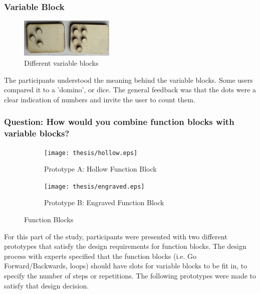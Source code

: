 \documentclass[oneside,%
                    author={Malak Hajji},
                    degree={BSc},
                    title={Designing An Accessible Computational Toolkit For Students},
                  subtitle={With Mixed Visual Abilities}]{dissertation}
\begin{document}
\subsubsection{Variable Block}

\FloatBarrier
\begin{figure}[h]
    \centering
    \includegraphics[width=0.4\textwidth]{thesis/variables.eps}
    \caption{Different variable blocks}
    \label{fig-variable}
\end{figure}
\FloatBarrier

The participants understood the meaning behind the variable blocks. Some users compared it to a 'domino', or dice. The general feedback was that the dots were a clear indication of numbers and invite the user to count them.

\subsubsection{Question: How would you combine function blocks with variable blocks?}

\FloatBarrier

\begin{figure}[h]
\centering
\begin{subfigure}{.5\textwidth}
  \centering
  \texttt{[image: thesis/hollow.eps]}
  \caption{Prototype A: Hollow Function Block}
  \label{fig-hollow}
\end{subfigure}%
\begin{subfigure}{.5\textwidth}
  \centering
  \texttt{[image: thesis/engraved.eps]}
  \caption{Prototype B: Engraved Function Block} 
  \label{fig-engraved}
\end{subfigure}
\caption{Function Blocks}
\label{fig-function}
\end{figure}
\FloatBarrier

For this part of the study, participants were presented with two different prototypes that satisfy the design requirements for function blocks. The design process with experts specified that the function blocks (i.e. Go Forward/Backwards, loops) should have slots for variable blocks to be fit in, to specify the number of steps or repetitions. The following prototypes were made to satisfy that design decision.
\end{document}

